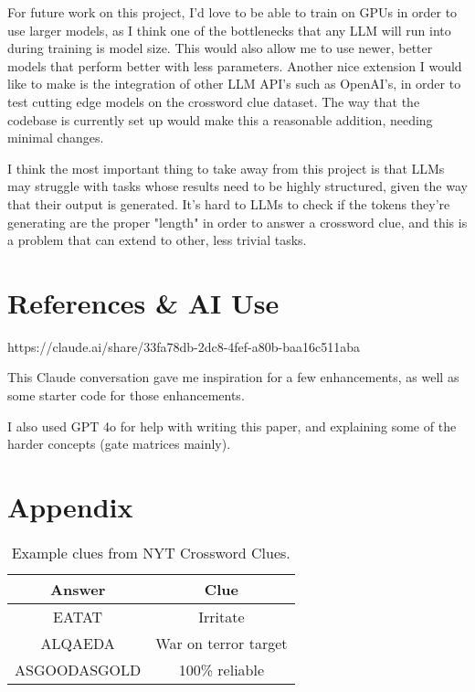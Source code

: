 \documentclass[
	a4paper, %
	10pt, %
	unnumberedsections, %
	twoside, %
]{LTJournalArticle}
\begin{document}
For future work on this project, I'd love to be able to train on GPUs in order to use larger models, as I think one of the bottlenecks that any LLM will run into during training is model size. This would also allow me to use newer, better models that perform better with less parameters. Another nice extension I would like to make is the integration of other LLM API's such as OpenAI's, in order to test cutting edge models on the crossword clue dataset. The way that the codebase is currently set up would make this a reasonable addition, needing minimal changes.

I think the most important thing to take away from this project is that LLMs may struggle with tasks whose results need to be highly structured, given the way that their output is generated. It's hard to LLMs to check if the tokens they're generating are the proper "length" in order to answer a crossword clue, and this is a problem that can extend to other, less trivial tasks.





\section{References \& AI Use}

\printbibliography[]

https://claude.ai/share/33fa78db-2dc8-4fef-a80b-baa16c511aba

This Claude conversation gave me inspiration for a few enhancements, as well as some starter code for those enhancements.

I also used GPT 4o for help with writing this paper, and explaining some of the harder concepts (gate matrices mainly).

\newpage

\section{Appendix}

\begin{table*}[h] %
	\centering	
	\caption{Example clues from NYT Crossword Clues.}
	\begin{tabular}{c c}
		\toprule
		Answer & Clue \\
		\midrule
		EATAT & Irritate\\
		ALQAEDA & War on terror target\\
		ASGOODASGOLD & 100\% reliable\\
		\bottomrule
	\end{tabular}
	\label{tab:NYTClues}
\end{table*}
\end{document}
